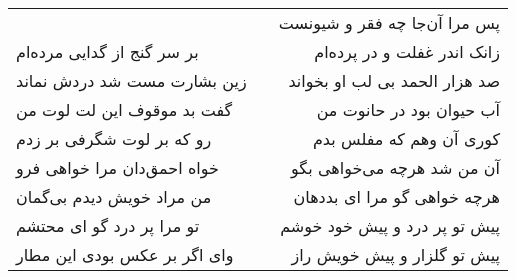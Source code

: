 \begin{center}
\begin{longtable}{l p{0.5cm} r}
&&
پس مرا آن‌جا چه فقر و شیونست
\\
بر سر گنج از گدایی مرده‌ام
&&
زانک اندر غفلت و در پرده‌ام
\\
زین بشارت مست شد دردش نماند
&&
صد هزار الحمد بی لب او بخواند
\\
گفت بد موقوف این لت لوت من
&&
آب حیوان بود در حانوت من
\\
رو که بر لوت شگرفی بر زدم
&&
کوری آن وهم که مفلس بدم
\\
خواه احمق‌دان مرا خواهی فرو
&&
آن من شد هرچه می‌خواهی بگو
\\
من مراد خویش دیدم بی‌گمان
&&
هرچه خواهی گو مرا ای بددهان
\\
تو مرا پر درد گو ای محتشم
&&
پیش تو پر درد و پیش خود خوشم
\\
وای اگر بر عکس بودی این مطار
&&
پیش تو گلزار و پیش خویش راز
\\
\end{longtable}
\end{center}
